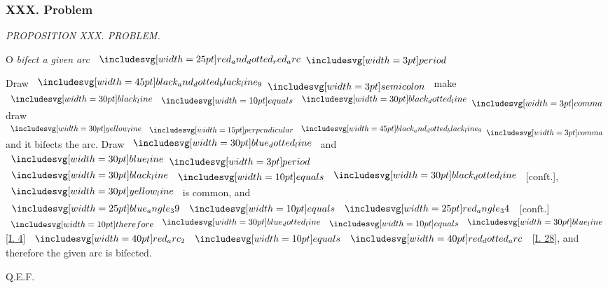 \documentclass[11pt,preview]{standalone}
\begin{document}
\subsubsection{XXX. Problem}

\begin{minipage}[t]{0.43\textwidth}
    \vspace{20pt}
    
\end{minipage}%
\hfill
\begin{minipage}[t]{0.54\textwidth}
    \begin{center}
        \textit{PROPOSITION XXX. PROBLEM.}\label{book3pr30} \\
    \end{center}

    \hfill

    \begin{center}
        \raggedright \lettrine[lines=3, loversize=1, nindent=0pt]{}{}O \textit{biſect a given arc} $\img{red_and_dotted_red_arc} \bperiod$
    \end{center}
\end{minipage}%

\hfill

\hfill

\begin{center}
    Draw $\bimg{black_and_dotted_black_line_9} \bsemicolon$ make $\blackline \bequals \dottedblackline \bcomma$ draw $\yellowline \bperp \bimg{black_and_dotted_black_line_9} \bcomma$  and it biſects the arc. Draw $\dottedblueline$ and $\blueline \bperiod$ $\blackline \bequals \dottedblackline$ [conſt.], $\yellowline$ is common, and $\img{blue_angle_39} \bequals \img{red_angle_34}$ [conſt.] $\btherefore \dottedblueline \bequals \blueline$ [\hyperref[book1pr4]{\textsc{I.} 4}] $\img[0][0][40]{red_arc_2} \bequals \img[0][0][40]{red_dotted_arc}$ [\hyperref[book3pr28]{\textsc{I.} 28}], and therefore the given arc is biſected.
\end{center}

\hfill

\hfill Q.E.F.
\end{document}
